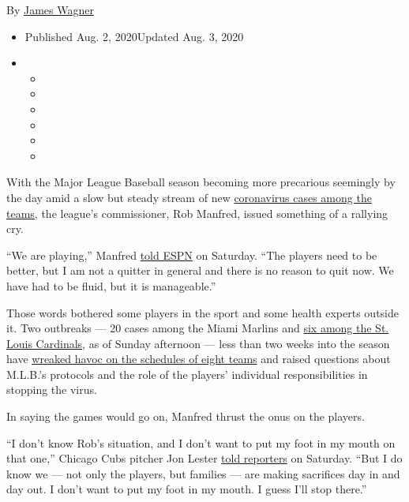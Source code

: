 By \href{https://www.nytimes.com/by/james-wagner}{James Wagner}

\begin{itemize}
\item
  Published Aug. 2, 2020Updated Aug. 3, 2020
\item
  \begin{itemize}
  \item
  \item
  \item
  \item
  \item
  \item
  \end{itemize}
\end{itemize}

With the Major League Baseball season becoming more precarious seemingly
by the day amid a slow but steady stream of new
\href{https://www.nytimes.com/2020/08/03/sports/baseball/mlb-coronavirus-outbreak.html}{coronavirus
cases among the teams}, the league's commissioner, Rob Manfred, issued
something of a rallying cry.

``We are playing,'' Manfred
\href{https://twitter.com/karlravechespn/status/1289628827157581830}{told
ESPN} on Saturday. ``The players need to be better, but I am not a
quitter in general and there is no reason to quit now. We have had to be
fluid, but it is manageable.''

Those words bothered some players in the sport and some health experts
outside it. Two outbreaks --- 20 cases among the Miami Marlins and
\href{https://www.nytimes.com/2020/08/01/sports/baseball/coronavirus-cardinals.html}{six
among the St. Louis Cardinals}, as of Sunday afternoon --- less than two
weeks into the season have
\href{https://www.nytimes.com/2020/07/30/sports/baseball/phillies-blue-jays-postponed-coronavirus.html}{wreaked
havoc on the schedules of eight teams} and raised questions about
M.L.B.'s protocols and the role of the players' individual
responsibilities in stopping the virus.

In saying the games would go on, Manfred thrust the onus on the players.

``I don't know Rob's situation, and I don't want to put my foot in my
mouth on that one,'' Chicago Cubs pitcher Jon Lester
\href{https://theathletic.com/1968292/2020/08/02/at-a-time-like-this-jon-lester-isnt-going-to-blame-or-second-guess-the-players/}{told
reporters} on Saturday. ``But I do know we --- not only the players, but
families --- are making sacrifices day in and day out. I don't want to
put my foot in my mouth. I guess I'll stop there.''

